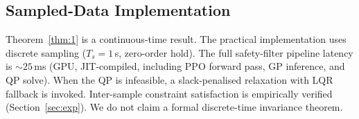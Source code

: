 \subsection{Sampled-Data Implementation}

Theorem~\ref{thm:1} is a continuous-time result. The practical implementation uses discrete sampling ($T_s = 1$\,s, zero-order hold). The full safety-filter pipeline latency is ${\sim}25$\,ms (GPU, JIT-compiled, including PPO forward pass, GP inference, and QP solve). When the QP is infeasible, a slack-penalised relaxation with LQR fallback is invoked. Inter-sample constraint satisfaction is empirically verified (Section~\ref{sec:exp}). We do not claim a formal discrete-time invariance theorem.
